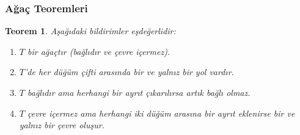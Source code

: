 \documentclass[dvipsnames]{beamer}
\theoremstyle{definition}
\theoremstyle{example}
\theoremstyle{plain}
\newtheorem{teorem}[theorem]{Teorem}
\begin{document}
\begin{frame}
  \frametitle{Ağaç Teoremleri}

  \begin{teorem}
    Aşağıdaki bildirimler eşdeğerlidir:

    \begin{enumerate}
      \item $T$ bir ağaçtır (bağlıdır ve çevre içermez).
      \item $T$'de her düğüm çifti arasında bir ve yalnız bir yol vardır.
      \item $T$ bağlıdır ama herhangi bir ayrıt çıkarılırsa artık bağlı olmaz.
      \item $T$ çevre içermez ama herhangi iki düğüm arasına bir ayrıt eklenirse
        bir ve yalnız bir çevre oluşur.
    \end{enumerate}
  \end{teorem}
%
\end{frame}
%
%
%
%
%
%
\end{document}
